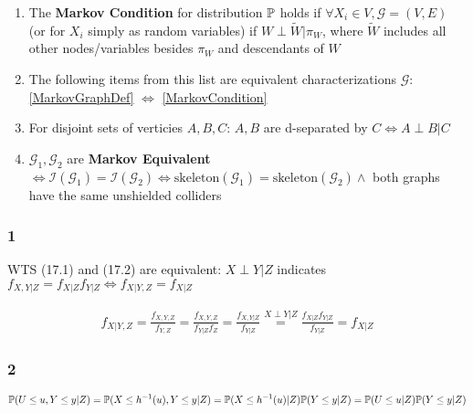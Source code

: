 \documentclass[11pt]{article}
\begin{document}
\begin{enumerate}
    \item \label{MarkovCondition} The \textbf{Markov Condition} for distribution $\mathbb{P}$ holds if $\forall X_i \in V, \mathcal{G}=(V,E)$ (or for $X_i$ simply as random variables) if $W \perp \tilde{W} | \pi_W$, where $\tilde{W}$ includes all other nodes/variables besides $\pi_W$ and descendants of $W$ 


    \item The following items from this list are equivalent characterizations $\mathcal{G}$: \ref{MarkovGraphDef} $\Leftrightarrow$
    \ref{MarkovCondition} 

    \item For disjoint sets of verticies $A,B,C$: $A,B$ are d-separated by $C \Leftrightarrow A \perp B | C$ 

    \item $\mathcal{G}_1, \mathcal{G}_2$ are \textbf{Markov Equivalent} $\Leftrightarrow \mathcal{I}(\mathcal{G}_1) = \mathcal{I}(\mathcal{G}_2) \Leftrightarrow \text{skeleton}(\mathcal{G}_1) = \text{skeleton}(\mathcal{G}_2) \land $ both graphs have the same unshielded colliders 
\end{enumerate}



\subsubsection*{1}

WTS (17.1) and (17.2) are equivalent: $X\perp Y |Z$ indicates
$f_{X,Y|Z}=f_{X|Z}f_{Y|Z} \Leftrightarrow f_{X|Y,Z} = f_{X|Z}$

\begin{gather*}
    f_{X|Y,Z}
    =
    \frac{ f_{X, Y, Z} }{ f_{Y, Z} }
    =
    \frac{ f_{X, Y, Z} }{ f_{Y|Z} f_Z }
    =
    \frac{ f_{X, Y | Z} }{ f_{Y|Z}}    
    \stackrel{X \perp Y |Z}{=}
    \frac{ f_{X| Z} f_{Y|Z} }{ f_{Y|Z}}    
    =
    f_{X|Z}
\end{gather*}

\subsubsection*{2}

\begin{gather*}
    \mathbb{P} (U\leq u, Y \leq y | Z)
        =
    \mathbb{P} (X \leq h^{-1}(u), Y \leq y | Z)
    =
    \mathbb{P} (X \leq h^{-1}(u)|Z)
    \mathbb{P} ( Y \leq y | Z)
    =
    \mathbb{P} (U \leq u|Z)
    \mathbb{P} ( Y \leq y | Z)    
\end{gather*}
\end{document}

